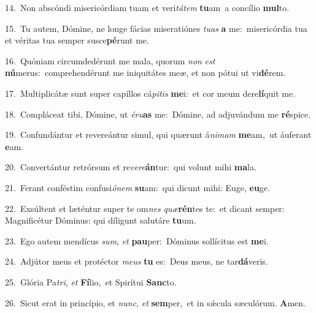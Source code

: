 {\numbfont\textcolor{\numbcolor}{14.}}~Non abscóndi misericórdiam tuam et veri\-\textit{tá}\-\textit{tem} \textbf{tu}\-am~\star a concílio \textbf{mul}\-to.\par
{\numbfont\textcolor{\numbcolor}{15.}}~Tu autem, Dómine, ne longe fácias miseratiónes \textit{tu}\-\textit{as} \textbf{a} me:~\star misericórdia tua et véritas tua semper susce\-\textbf{pé}\-runt me.\par
{\numbfont\textcolor{\numbcolor}{16.}}~Quóniam circumdedérunt me mala, quorum \textit{non} \textit{est} \textbf{nú}\-merus:~\star comprehendérunt me iniquitátes meæ, et non pótui ut vi\-\textbf{dé}\-rem.\par
{\numbfont\textcolor{\numbcolor}{17.}}~Multiplicátæ sunt super capíllos cá\-\textit{pi}\-\textit{tis} \textbf{me}\-i:~\star et cor meum dere\-\textbf{lí}\-quit me.\par
{\numbfont\textcolor{\numbcolor}{18.}}~Compláceat tibi, Dómine, ut \textit{é}\-\textit{ru}\textbf{as} me:~\star Dómine, ad adjuvándum me \textbf{ré}\-spice.\par
{\numbfont\textcolor{\numbcolor}{19.}}~Confundántur et revereántur simul, qui quærunt á\-\textit{ni}\-\textit{mam} \textbf{me}\-am,~\star ut áuferant \textbf{e}\-am.\par
{\numbfont\textcolor{\numbcolor}{20.}}~Convertántur retrórsum et re\-\textit{ve}\-\textit{re}\textbf{án}tur:~\star qui volunt mihi \textbf{ma}\-la.\par
{\numbfont\textcolor{\numbcolor}{21.}}~Ferant conféstim confusi\-\textit{ó}\-\textit{nem} \textbf{su}\-am:~\star qui dicunt mihi: Euge, \textbf{eu}\-ge.\par
{\numbfont\textcolor{\numbcolor}{22.}}~Exsúltent et læténtur super te om\textit{nes} \textit{quæ}\-\textbf{rén}tes te:~\star et dicant semper: Magnificétur Dóminus: qui díligunt salutáre \textbf{tu}\-um.\par
{\numbfont\textcolor{\numbcolor}{23.}}~Ego autem mendícus \textit{sum}\-, \textit{et} \textbf{pau}\-per:~\star Dóminus sollícitus est \textbf{me}\-i.\par
{\numbfont\textcolor{\numbcolor}{24.}}~Adjútor meus et protéctor \textit{me}\-\textit{us} \textbf{tu} es:~\star Deus meus, ne tar\-\textbf{dá}\-veris.\par
{\numbfont\textcolor{\numbcolor}{25.}}~Glória Pa\-\textit{tri}\-, \textit{et} \textbf{Fí}\-lio,~\star et Spirítui \textbf{Sanc}\-to.\par
{\numbfont\textcolor{\numbcolor}{26.}}~Sicut erat in princípio, et \textit{nunc}\-, \textit{et} \textbf{sem}\-per,~\star et in sǽcula sæculórum. \textbf{A}\-men.\par
